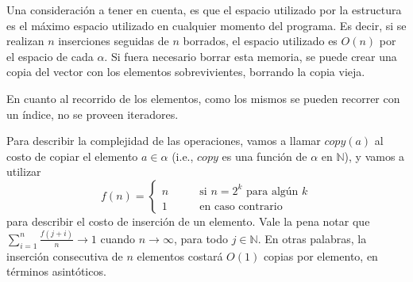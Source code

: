 \documentclass[a4paper,10pt]{article}
\begin{document}

Una consideración a tener en cuenta, es que el espacio utilizado por la estructura es el máximo espacio utilizado en cualquier momento del programa.  Es decir, si se realizan $n$ inserciones seguidas de $n$ borrados, el espacio utilizado es $O(n)$ por el espacio de cada $\alpha$.  Si fuera necesario borrar esta memoria, se puede crear una copia del vector con los elementos sobrevivientes, borrando la copia vieja.

En cuanto al recorrido de los elementos, como los mismos se pueden recorrer con un índice, no se proveen iteradores.

Para describir la complejidad de las operaciones, vamos a llamar $copy(a)$ al costo de copiar el elemento $a \in \alpha$ (i.e., $copy$ es una función de $\alpha$ en $\mathbb{N}$), y vamos a utilizar
\[f(n) = \begin{cases} n & \qquad \text{si $n = 2^k$ para algún $k$} \\
                      1 & \qquad \text{en caso contrario}
        \end{cases}
\]
para describir el costo de inserción de un elemento.  Vale la pena notar que $\displaystyle\sum_{i=1}^n \frac{f(j+i)}{n} \to 1$ cuando $n \to \infty$, para todo $j \in \mathbb{N}$.  En otras palabras, la inserción consecutiva de $n$ elementos costará $O(1)$ copias por elemento, en términos asintóticos.
\end{document}
